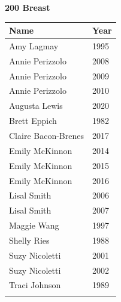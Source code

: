\vspace{1.2em}
\noindent\begin{minipage}[t]{0.48\textwidth}
\centering
\textbf{\textcolor{teamprimary}{200 Breast}}\par
\vspace{0.5em}
\centering
\small
\renewcommand{\arraystretch}{1.0}
\setlength{\tabcolsep}{4pt}
\begin{tabular}{@{}p{3.0cm}p{1.0cm}@{}}
\toprule
\textbf{Name} & \textbf{Year} \\
\midrule
Amy Lagmay & 1995 \\
Annie Perizzolo & 2008 \\
Annie Perizzolo & 2009 \\
Annie Perizzolo & 2010 \\
Augusta Lewis & 2020 \\
Brett Eppich & 1982 \\
Claire Bacon-Brenes & 2017 \\
Emily McKinnon & 2014 \\
Emily McKinnon & 2015 \\
Emily McKinnon & 2016 \\
Lisal Smith & 2006 \\
Lisal Smith & 2007 \\
Maggie Wang & 1997 \\
Shelly Ries & 1988 \\
Suzy Nicoletti & 2001 \\
Suzy Nicoletti & 2002 \\
Traci Johnson & 1989 \\
\bottomrule
\vspace{0.5em}
\end{tabular}
\end{minipage}
\hfill
